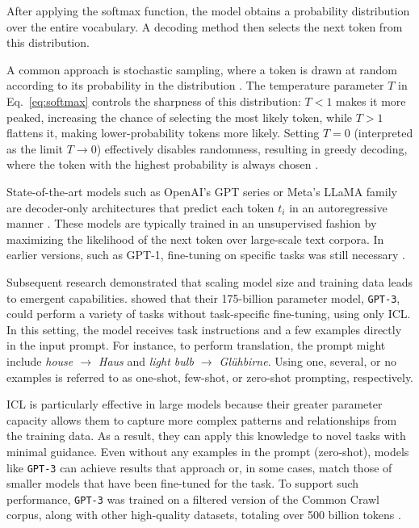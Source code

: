 \documentclass[a4paper,oneside,bibliography=totoc]{scrbook}
\begin{document}
After applying the softmax function, the model obtains a probability distribution over the entire vocabulary. A decoding method then selects the next token from this distribution.

A common approach is stochastic sampling, where a token is drawn at random according to its probability in the distribution \cite{Brown2020}. The temperature parameter $T$ in Eq.~\eqref{eq:softmax} controls the sharpness of this distribution: $T < 1$ makes it more peaked, increasing the chance of selecting the most likely token, while $T > 1$ flattens it, making lower-probability tokens more likely. Setting $T = 0$ (interpreted as the limit $T \to 0$) effectively disables randomness, resulting in greedy decoding, where the token with the highest probability is always chosen \cite{Peeperkorn2024}.

State-of-the-art models such as OpenAI’s \ac{GPT} series or Meta’s \ac{LLaMA} family are decoder-only architectures that predict each token $t_i$ in an autoregressive manner \cite{Radford2018,Grattafiori2024}. These models are typically trained in an unsupervised fashion by maximizing the likelihood of the next token over large-scale text corpora. In earlier versions, such as GPT-1, fine-tuning on specific tasks was still necessary \cite{Radford2018}.

Subsequent research demonstrated that scaling model size and training data leads to emergent capabilities. \citet{Brown2020} showed that their 175-billion parameter model, \texttt{GPT-3}, could perform a variety of tasks without task-specific fine-tuning, using only \ac{ICL}. In this setting, the model receives task instructions and a few examples directly in the input prompt. For instance, to perform translation, the prompt might include \textit{house $\rightarrow$ Haus} and \textit{light bulb $\rightarrow$ Glühbirne}. Using one, several, or no examples is referred to as one-shot, few-shot, or zero-shot prompting, respectively.

\Ac{ICL} is particularly effective in large models because their greater parameter capacity allows them to capture more complex patterns and relationships from the training data. As a result, they can apply this knowledge to novel tasks with minimal guidance. Even without any examples in the prompt (zero-shot), models like \texttt{GPT-3} can achieve results that approach or, in some cases, match those of smaller models that have been fine-tuned for the task. To support such performance, \texttt{GPT-3} was trained on a filtered version of the Common Crawl corpus, along with other high-quality datasets, totaling over 500 billion tokens \cite{Brown2020}.
\end{document}
